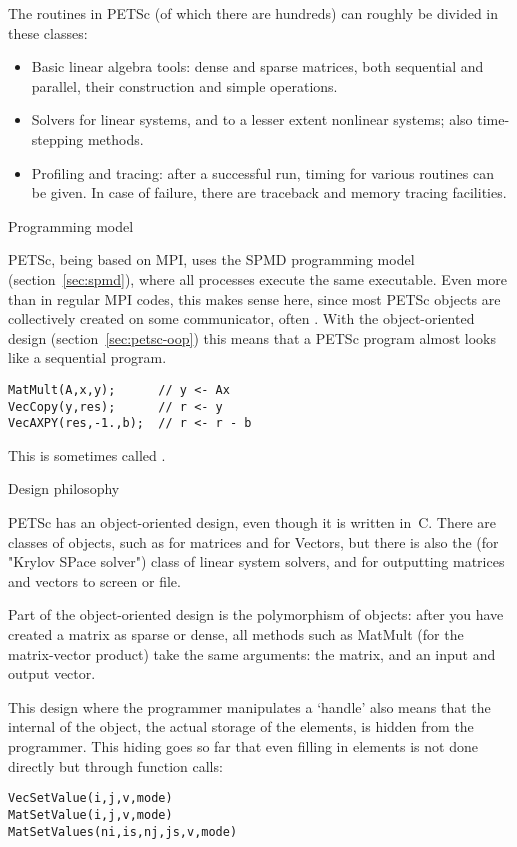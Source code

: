 The routines in PETSc (of which there are hundreds) can roughly be
divided in these classes:
\begin{itemize}
\item Basic linear algebra tools: dense and sparse matrices, both
  sequential and parallel, their construction and simple operations.
\item Solvers for linear systems, and to a lesser extent nonlinear
  systems; also time-stepping methods.
\item Profiling and tracing: after a successful run, timing for
  various routines can be given. In case of failure, there are
  traceback and memory tracing facilities.
\end{itemize}

 {Programming model}

PETSc, being based on MPI, uses the \ac{SPMD} programming model
(section~\ref{sec:spmd}), where all processes execute the same
executable. Even more than in regular MPI codes, this makes sense
here, since most PETSc objects are collectively created on some
communicator, often . With the
object-oriented design (section~\ref{sec:petsc-oop}) this means that a
PETSc program almost looks like a sequential program.
\begin{lstlisting}
MatMult(A,x,y);      // y <- Ax
VecCopy(y,res);      // r <- y
VecAXPY(res,-1.,b);  // r <- r - b
\end{lstlisting}
This is
sometimes called .

 {Design philosophy}
\label{sec:petsc-oop}

PETSc has an object-oriented design, even though it is written
in~C. There are classes of objects, such as  for
matrices and  for Vectors, but there is also the
 (for "Krylov SPace solver") class of linear system solvers, and
 for outputting matrices and vectors to screen or file.

Part of the object-oriented design is the polymorphism of objects:
after you have created a  matrix as sparse or dense, all methods
such as MatMult (for the matrix-vector product) take the same
arguments: the matrix, and an input and output vector.

This design where the programmer manipulates a `handle' also means
that the internal of the object, the actual storage of the elements,
is hidden from the programmer. This hiding goes so far that even
filling in elements is not done directly but through function calls:
\begin{lstlisting}
VecSetValue(i,j,v,mode)
MatSetValue(i,j,v,mode)
MatSetValues(ni,is,nj,js,v,mode)
\end{lstlisting}

